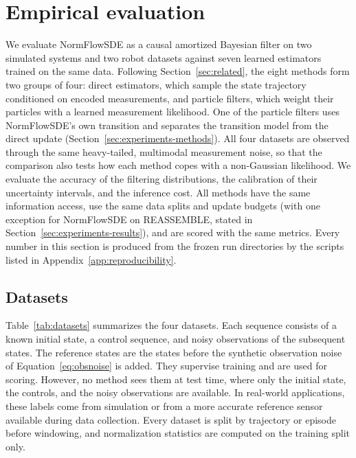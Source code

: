 \providecommand{\tbd}{\textbf{[TBD]}}
\providecommand{\figplaceholder}[1]{\fbox{\parbox[c][0.28\linewidth][c]{0.96\linewidth}{\centering\small Figure placeholder: #1}}}

\section{Empirical evaluation}\label{sec:experiments}
We evaluate NormFlowSDE as a causal amortized Bayesian filter on two simulated systems and two robot datasets against seven learned estimators trained on the same data. Following Section~\ref{sec:related}, the eight methods form two groups of four: direct estimators, which sample the state trajectory conditioned on encoded measurements, and particle filters, which weight their particles with a learned measurement likelihood. One of the particle filters uses NormFlowSDE's own transition and separates the transition model from the direct update (Section~\ref{sec:experiments-methods}). All four datasets are observed through the same heavy-tailed, multimodal measurement noise, so that the comparison also tests how each method copes with a non-Gaussian likelihood. We evaluate the accuracy of the filtering distributions, the calibration of their uncertainty intervals, and the inference cost. All methods have the same information access, use the same data splits and update budgets (with one exception for NormFlowSDE on REASSEMBLE, stated in Section~\ref{sec:experiments-results}), and are scored with the same metrics. Every number in this section is produced from the frozen run directories by the scripts listed in Appendix~\ref{app:reproducibility}.

\subsection{Datasets}\label{sec:experiments-data}
Table~\ref{tab:datasets} summarizes the four datasets. Each sequence consists of a known initial state, a control sequence, and noisy observations of the subsequent states. The reference states are the states before the synthetic observation noise of Equation~\eqref{eq:obsnoise} is added. They supervise training and are used for scoring. However, no method sees them at test time, where only the initial state, the controls, and the noisy observations are available. In real-world applications, these labels come from simulation or from a more accurate reference sensor available during data collection. Every dataset is split by trajectory or episode before windowing, and normalization statistics are computed on the training split only.

